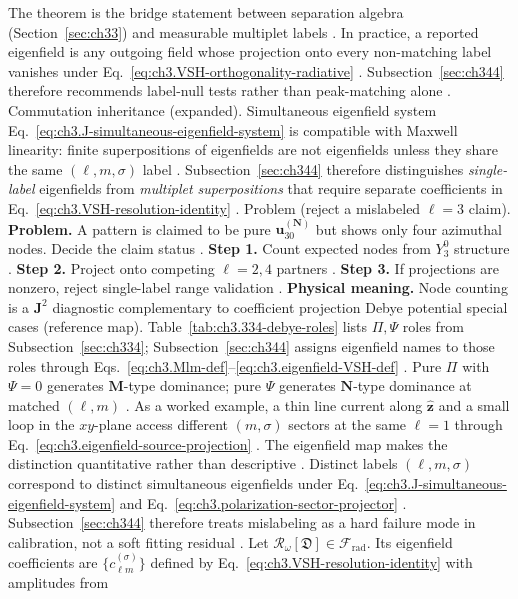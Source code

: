 The theorem is the bridge statement between separation algebra (Section~\ref{sec:ch33}) and measurable multiplet
labels . In practice, a reported eigenfield is any outgoing field whose
projection onto every non-matching label vanishes under Eq.~\eqref{eq:ch3.VSH-orthogonality-radiative}
. Subsection~\ref{sec:ch344} therefore recommends label-null tests rather than
peak-matching alone .
Commutation inheritance (expanded). Simultaneous eigenfield system Eq.~\eqref{eq:ch3.J-simultaneous-eigenfield-system} is compatible with Maxwell linearity:
finite superpositions of eigenfields are not eigenfields unless they share the same \((\ell,m,\sigma)\) label
. Subsection~\ref{sec:ch344} therefore distinguishes \emph{single-label}
eigenfields from \emph{multiplet superpositions} that require separate coefficients in
Eq.~\eqref{eq:ch3.VSH-resolution-identity} .
Problem (reject a mislabeled \(\ell=3\) claim). \textbf{Problem.} A pattern is claimed to be pure \(\mathbf{u}_{30}^{(\mathbf{N})}\) but shows only four azimuthal
nodes. Decide the claim status .
\textbf{Step 1.} Count expected nodes from \(Y_{3}^{0}\) structure .
\textbf{Step 2.} Project onto competing \(\ell=2,4\) partners .
\textbf{Step 3.} If projections are nonzero, reject single-label range validation .
\textbf{Physical meaning.} Node counting is a \(\mathbf{J}^{2}\) diagnostic complementary to coefficient projection
Debye potential special cases (reference map). Table~\ref{tab:ch3.334-debye-roles} lists \(\Pi,\Psi\) roles from Subsection~\ref{sec:ch334}; Subsection~\ref{sec:ch344}
assigns eigenfield names to those roles through Eqs.~\eqref{eq:ch3.Mlm-def}--\eqref{eq:ch3.eigenfield-VSH-def}
. Pure \(\Pi\) with \(\Psi=0\) generates \(\mathbf{M}\)-type dominance; pure \(\Psi\) generates
\(\mathbf{N}\)-type dominance at matched \((\ell,m)\) .
As a worked example, a thin line current along \(\hat{\mathbf{z}}\) and a small loop in the \(xy\)-plane access different
\((m,\sigma)\) sectors at the same \(\ell=1\) through Eq.~\eqref{eq:ch3.eigenfield-source-projection}
. The eigenfield map makes the distinction quantitative rather than
descriptive .
Distinct labels \((\ell,m,\sigma)\) correspond to distinct simultaneous eigenfields under
Eq.~\eqref{eq:ch3.J-simultaneous-eigenfield-system} and Eq.~\eqref{eq:ch3.polarization-sector-projector}
. Subsection~\ref{sec:ch344} therefore treats mislabeling as a hard
failure mode in calibration, not a soft fitting residual .
Let \(\mathcal{R}_\omega[\mathfrak{D}]\in\mathcal{F}_{\mathrm{rad}}\). Its eigenfield coefficients are
\(\{c_{\ell m}^{(\sigma)}\}\) defined by Eq.~\eqref{eq:ch3.VSH-resolution-identity} with amplitudes from
